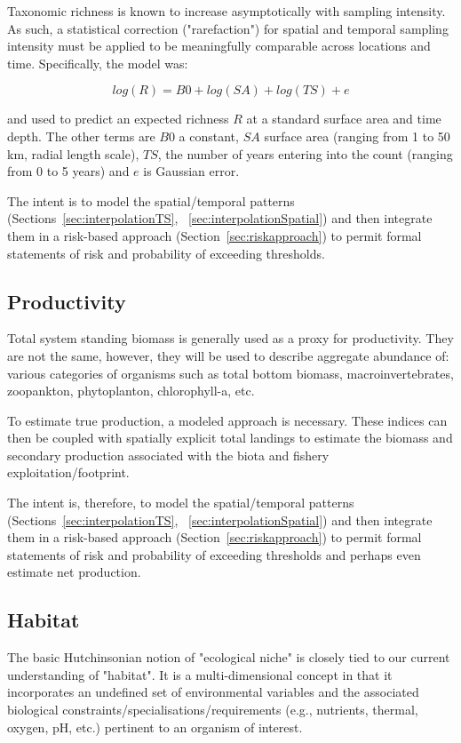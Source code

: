 \documentclass[letterpaper,portrait,11pt]{scrartcl}
\numberwithin{equation}{section}		%
\numberwithin{figure}{section}		%
\numberwithin{table}{section}				%
\begin{document}
Taxonomic richness is known to increase asymptotically with sampling intensity. As such, a statistical correction ("rarefaction") for spatial and temporal sampling intensity must be applied to be meaningfully comparable across locations and time. Specifically, the model was:

\[
log(R) = B0 + log(SA) + log(TS) + e
\]

and used to predict an expected richness $R$ at a standard surface area and time depth. The other terms are $B0$ a constant, $SA$ surface area (ranging from 1 to 50 km, radial length scale), $TS$, the number of years entering into the count (ranging from 0 to 5 years) and $e$ is Gaussian error.  

The intent is to model the spatial/temporal patterns (Sections~\ref{sec:interpolationTS}, ~\ref{sec:interpolationSpatial}) and then integrate them in a risk-based approach (Section~\ref{sec:riskapproach}) to permit formal statements of risk and probability of exceeding thresholds. 


\subsection{Productivity}

Total system standing biomass is generally used as a proxy for productivity. They are not the same, however, they will be used to describe aggregate abundance of: various categories of organisms such as total bottom biomass, macroinvertebrates, zoopankton, phytoplanton, chlorophyll-a, etc. 

To estimate true production, a modeled approach is necessary. These indices can then be coupled with spatially explicit total landings to estimate the biomass and secondary production associated with the biota and fishery exploitation/footprint. 

The intent is, therefore, to model the spatial/temporal patterns (Sections~\ref{sec:interpolationTS}, ~\ref{sec:interpolationSpatial}) and then integrate them in a risk-based approach (Section~\ref{sec:riskapproach}) to permit formal statements of risk and probability of exceeding thresholds and perhaps even estimate net production. 


\subsection{Habitat}

The basic Hutchinsonian notion of "ecological niche" is closely tied to our current understanding of "habitat". It is a multi-dimensional concept in that it incorporates an undefined set of  environmental variables and the associated biological constraints/specialisations/requirements (e.g., nutrients, thermal, oxygen, pH, etc.) pertinent to an organism of interest. 
\end{document}
